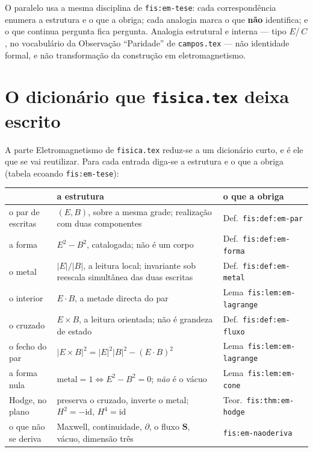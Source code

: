 \documentclass[11pt,a4paper]{article}
\newcommand{\abs}[1]{\lvert #1\rvert}
\begin{document}
O paralelo usa a mesma disciplina de \texttt{fis:em-tese}: cada correspondência
enumera a estrutura e o que a obriga; cada analogia marca o que \textbf{não}
identifica; e o que continua pergunta fica pergunta. Analogia estrutural e
interna --- tipo $E$/\,$C$, no vocabulário da Observação ``Paridade'' de
\texttt{campos.tex} --- não identidade formal, e não transformação da construção
em eletromagnetismo.

\section{O dicionário que \texttt{fisica.tex} deixa escrito}\label{sec:dicionario}

A parte Eletromagnetismo de \texttt{fisica.tex} reduz-se a um dicionário curto,
e é ele que se vai reutilizar. Para cada entrada diga-se a estrutura e o que a
obriga (tabela ecoando \texttt{fis:em-tese}):

\begin{center}\small
\begin{tabular}{@{}p{}p{}l@{}}
\toprule
 & \textbf{a estrutura} & \textbf{o que a obriga} \\
\midrule
o par de escritas & $(E,B)$, sobre a mesma grade; realização com duas
  componentes & Def.~\texttt{fis:def:em-par} \\
a forma & $E^{2}-B^{2}$, catalogada; não é um corpo & Def.~\texttt{fis:def:em-forma} \\
o metal & $\abs{E}/\abs{B}$, a leitura local; invariante sob reescala simultânea das duas escritas & Def.~\texttt{fis:def:em-metal} \\
o interior & $E\cdot B$, a metade directa do par & Lema~\texttt{fis:lem:em-lagrange} \\
o cruzado & $E\times B$, a leitura orientada; não é grandeza de estado & Def.~\texttt{fis:def:em-fluxo} \\
o fecho do par & $\abs{E\times B}^{2}=\abs{E}^{2}\abs{B}^{2}-(E\cdot B)^{2}$ & Lema~\texttt{fis:lem:em-lagrange} \\
a forma nula & $\text{metal}=1\iff E^{2}-B^{2}=0$; \emph{não} é o vácuo & Lema~\texttt{fis:lem:em-cone} \\
Hodge, no plano & preserva o cruzado, inverte o metal; $H^{2}=-\mathrm{id}$, $H^{4}=\mathrm{id}$ & Teor.~\texttt{fis:thm:em-hodge} \\
o que não se deriva & Maxwell, continuidade, $\partial$, o fluxo $\mathbf S$, vácuo, dimensão três & \texttt{fis:em-naoderiva} \\
\bottomrule
\end{tabular}
\end{center}
\end{document}
